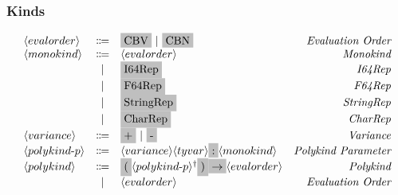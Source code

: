 \documentclass[11pt]{article}
\newcommand{\nonterminal}[1]{\langle #1 \rangle}
\newcommand{\terminal}[1]{\colorbox{lightgray}{\vphantom{X}#1}}
\newcommand{\commalist}[1]{#1^{\dagger}}
\begin{document}
\subsubsection{Kinds}
\[
  \begin{array}{lclr}
    \nonterminal{evalorder} & \Coloneqq & \terminal{CBV}\ |\ \terminal{CBN} & \emph{Evaluation Order} \\
    \nonterminal{monokind} & \Coloneqq & \nonterminal{evalorder} & \emph{Monokind} \\
    & | & \terminal{I64Rep} & \emph{I64Rep} \\
    & | & \terminal{F64Rep} & \emph{F64Rep} \\
    & | & \terminal{StringRep} & \emph{StringRep} \\
    & | & \terminal{CharRep} & \emph{CharRep} \\
    \nonterminal{variance} & \Coloneqq & \terminal{+}\ |\ \terminal{-} & \emph{Variance} \\
    \nonterminal{polykind$-$p} & \Coloneqq & \nonterminal{variance}\nonterminal{tyvar} \terminal{:} \nonterminal{monokind} & \emph{Polykind Parameter} \\
    \nonterminal{polykind} & \Coloneqq & \terminal{(} \commalist{\nonterminal{polykind$-$p}}\terminal{)} \terminal{$\rightarrow$} \nonterminal{evalorder} & \emph{Polykind} \\
    & | & \nonterminal{evalorder} & \emph{Evaluation Order}
  \end{array}
\]
\end{document}
